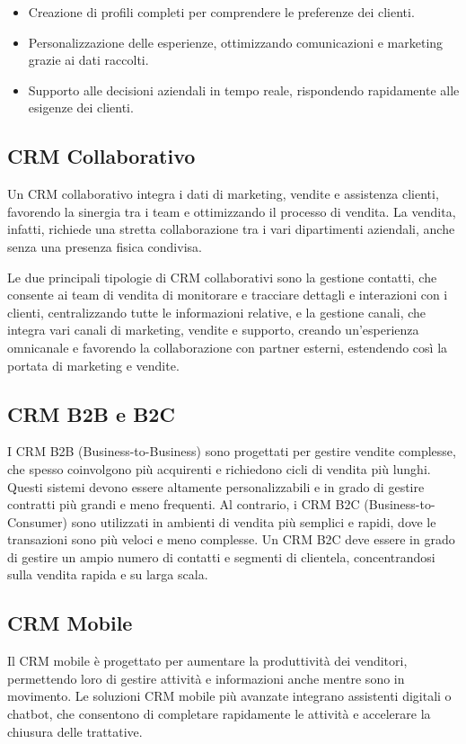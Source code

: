 \documentclass[target=bach,aauheader=,style=]{thud}
\begin{document}
\begin{itemize} 
    \item Creazione di profili completi per comprendere le preferenze dei clienti.
    \item Personalizzazione delle esperienze, ottimizzando comunicazioni e marketing grazie ai dati raccolti.
    \item Supporto alle decisioni aziendali in tempo reale, rispondendo rapidamente alle esigenze dei clienti.
\end{itemize}

\subsection{CRM Collaborativo}
Un CRM collaborativo integra i dati di marketing, vendite e assistenza clienti, favorendo la sinergia tra i team e ottimizzando il processo di vendita. La vendita, infatti, richiede una stretta collaborazione tra i vari dipartimenti aziendali, anche senza una presenza fisica condivisa. 

\noindent Le due principali tipologie di CRM collaborativi sono la gestione contatti, che consente ai team di vendita di monitorare e tracciare dettagli e interazioni con i clienti, centralizzando tutte le informazioni relative, e la gestione canali, che integra vari canali di marketing, vendite e supporto, creando un'esperienza omnicanale e favorendo la collaborazione con partner esterni, estendendo così la portata di marketing e vendite.

\subsection{CRM B2B e B2C} I CRM B2B (Business-to-Business) sono progettati per gestire vendite complesse, che spesso coinvolgono più acquirenti e richiedono cicli di vendita più lunghi. Questi sistemi devono essere altamente personalizzabili e in grado di gestire contratti più grandi e meno frequenti. Al contrario, i CRM B2C (Business-to-Consumer) sono utilizzati in ambienti di vendita più semplici e rapidi, dove le transazioni sono più veloci e meno complesse. Un CRM B2C deve essere in grado di gestire un ampio numero di contatti e segmenti di clientela, concentrandosi sulla vendita rapida e su larga scala.

\subsection{CRM Mobile} 
Il CRM mobile è progettato per aumentare la produttività dei venditori, permettendo loro di gestire attività e informazioni anche mentre sono in movimento. Le soluzioni CRM mobile più avanzate integrano assistenti digitali o chatbot, che consentono di completare rapidamente le attività e accelerare la chiusura delle trattative. 
\end{document}
